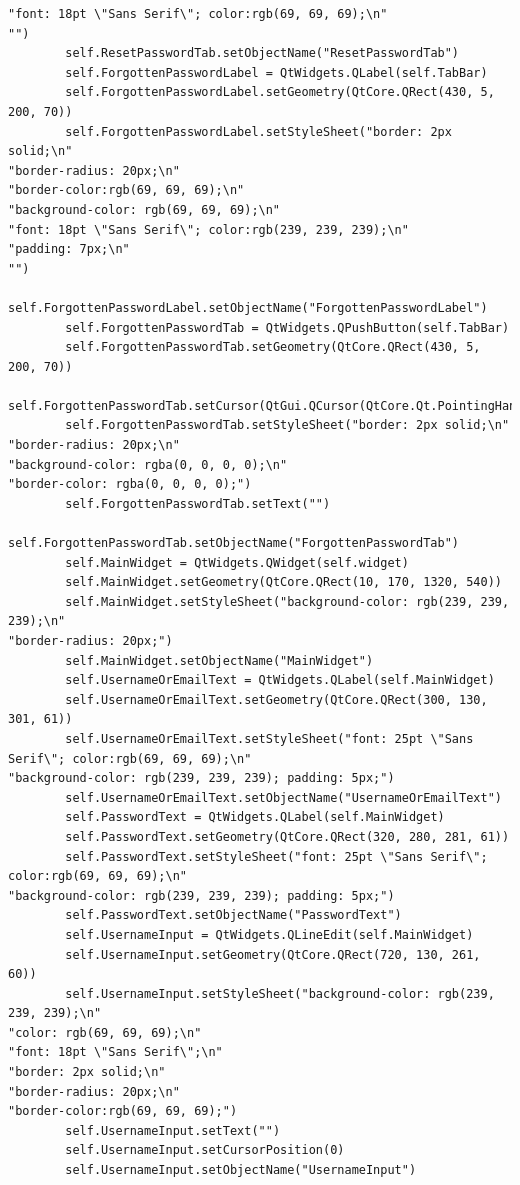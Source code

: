 \documentclass{article}
\begin{document}
\begin{lstlisting}
"font: 18pt \"Sans Serif\"; color:rgb(69, 69, 69);\n"
"")
        self.ResetPasswordTab.setObjectName("ResetPasswordTab")
        self.ForgottenPasswordLabel = QtWidgets.QLabel(self.TabBar)
        self.ForgottenPasswordLabel.setGeometry(QtCore.QRect(430, 5, 200, 70))
        self.ForgottenPasswordLabel.setStyleSheet("border: 2px solid;\n"
"border-radius: 20px;\n"
"border-color:rgb(69, 69, 69);\n"
"background-color: rgb(69, 69, 69);\n"
"font: 18pt \"Sans Serif\"; color:rgb(239, 239, 239);\n"
"padding: 7px;\n"
"")
        self.ForgottenPasswordLabel.setObjectName("ForgottenPasswordLabel")
        self.ForgottenPasswordTab = QtWidgets.QPushButton(self.TabBar)
        self.ForgottenPasswordTab.setGeometry(QtCore.QRect(430, 5, 200, 70))
        self.ForgottenPasswordTab.setCursor(QtGui.QCursor(QtCore.Qt.PointingHandCursor))
        self.ForgottenPasswordTab.setStyleSheet("border: 2px solid;\n"
"border-radius: 20px;\n"
"background-color: rgba(0, 0, 0, 0);\n"
"border-color: rgba(0, 0, 0, 0);")
        self.ForgottenPasswordTab.setText("")
        self.ForgottenPasswordTab.setObjectName("ForgottenPasswordTab")
        self.MainWidget = QtWidgets.QWidget(self.widget)
        self.MainWidget.setGeometry(QtCore.QRect(10, 170, 1320, 540))
        self.MainWidget.setStyleSheet("background-color: rgb(239, 239, 239);\n"
"border-radius: 20px;")
        self.MainWidget.setObjectName("MainWidget")
        self.UsernameOrEmailText = QtWidgets.QLabel(self.MainWidget)
        self.UsernameOrEmailText.setGeometry(QtCore.QRect(300, 130, 301, 61))
        self.UsernameOrEmailText.setStyleSheet("font: 25pt \"Sans Serif\"; color:rgb(69, 69, 69);\n"
"background-color: rgb(239, 239, 239); padding: 5px;")
        self.UsernameOrEmailText.setObjectName("UsernameOrEmailText")
        self.PasswordText = QtWidgets.QLabel(self.MainWidget)
        self.PasswordText.setGeometry(QtCore.QRect(320, 280, 281, 61))
        self.PasswordText.setStyleSheet("font: 25pt \"Sans Serif\"; color:rgb(69, 69, 69);\n"
"background-color: rgb(239, 239, 239); padding: 5px;")
        self.PasswordText.setObjectName("PasswordText")
        self.UsernameInput = QtWidgets.QLineEdit(self.MainWidget)
        self.UsernameInput.setGeometry(QtCore.QRect(720, 130, 261, 60))
        self.UsernameInput.setStyleSheet("background-color: rgb(239, 239, 239);\n"
"color: rgb(69, 69, 69);\n"
"font: 18pt \"Sans Serif\";\n"
"border: 2px solid;\n"
"border-radius: 20px;\n"
"border-color:rgb(69, 69, 69);")
        self.UsernameInput.setText("")
        self.UsernameInput.setCursorPosition(0)
        self.UsernameInput.setObjectName("UsernameInput")

\end{lstlisting}
\end{document}
